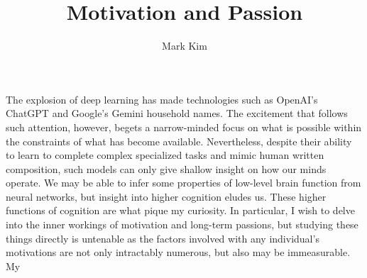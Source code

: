 \documentclass[12pt]{article}
\title{Motivation and Passion}
\author{Mark Kim}
\begin{document}
\maketitle

The explosion of deep learning has made technologies such as OpenAI's ChatGPT
and Google's Gemini household names.  The excitement that follows such
attention, however, begets a narrow-minded focus on what is possible within the
constraints of what has become available.  Nevertheless, despite their ability
to learn to complete complex specialized tasks and mimic human written
composition, such models can only give shallow insight on how our minds operate.
We may be able to infer some properties of low-level brain function from neural
networks, but insight into higher cognition eludes us.  These higher functions
of cognition are what pique my curiosity.  In particular, I wish to delve into
the inner workings of motivation and long-term passions, but studying these
things directly is untenable as the factors involved with any individual's
motivations are not only intractably numerous, but also may be immeasurable.  My 
\end{document}
